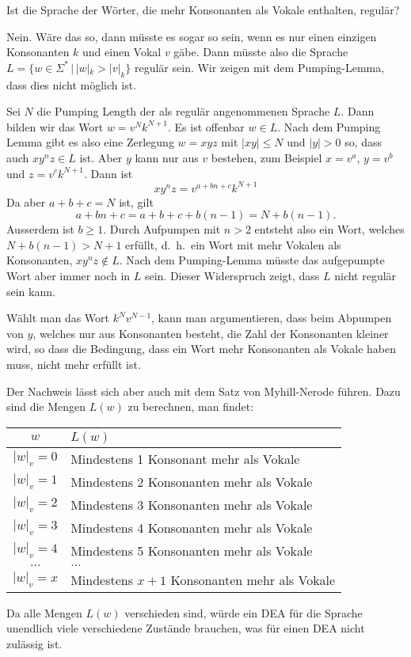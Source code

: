 Ist die Sprache der Wörter, die mehr Konsonanten als Vokale enthalten,
regulär?


\begin{loesung}
Nein. Wäre das so, dann müsste es sogar so sein, wenn es nur einen
einzigen Konsonanten $k$ und einen Vokal $v$ gäbe.
Dann müsste also die Sprache $L=\{ w\in\Sigma^*\,|\, |w|_k > |v|_k\}$
regulär sein. Wir zeigen mit dem Pumping-Lemma, dass dies nicht möglich
ist.

Sei $N$ die Pumping Length der als regulär angenommenen Sprache $L$.
Dann bilden wir das Wort $w=v^{N}k^{N+1}$. Es ist offenbar $w\in L$.
Nach dem Pumping Lemma gibt es also eine Zerlegung $w=xyz$ mit
$|xy|\le N$ und $|y|>0$ so, dass auch $xy^nz\in L$ ist.
Aber $y$ kann nur aus $v$ bestehen, zum Beispiel $x=v^a$, $y=v^b$ und
$z=v^ck^{N+1}$. Dann ist
\[
xy^nz=v^{a+bn+c}k^{N+1}
\]
Da aber $a+b+c=N$ ist, gilt
\[
a+bn+c=a+b+c + b(n-1)=N+b(n-1).
\]
Ausserdem ist $b\ge 1$.
Durch Aufpumpen mit $n> 2$ entsteht also ein Wort, welches
$N+b(n-1)> N+1$ erfüllt, d.~h.~ein Wort mit mehr Vokalen als
Konsonanten, $xy^nz\not\in L$. Nach dem Pumping-Lemma müsste das
aufgepumpte Wort aber immer noch in $L$ sein. Dieser Widerspruch
zeigt, dass $L$ nicht regulär sein kann.

Wählt man das Wort $k^Nv^{N-1}$, kann man argumentieren, dass
beim Abpumpen von $y$, welches nur aus Konsonanten besteht, die
Zahl der Konsonanten kleiner wird, so dass die Bedingung, dass ein
Wort mehr Konsonanten als Vokale haben muss, nicht mehr erfüllt ist.

Der Nachweis lässt sich aber auch mit dem Satz von Myhill-Nerode
führen. Dazu sind die Mengen $L(w)$ zu berechnen, man findet:
\begin{center}
\begin{tabular}{|c|l|}
\hline
$w$&$L(w)$\\
\hline
$|w|_v=0$&Mindestens 1 Konsonant mehr als Vokale\\
$|w|_v=1$&Mindestens 2 Konsonanten mehr als Vokale\\
$|w|_v=2$&Mindestens 3 Konsonanten mehr als Vokale\\
$|w|_v=3$&Mindestens 4 Konsonanten mehr als Vokale\\
$|w|_v=4$&Mindestens 5 Konsonanten mehr als Vokale\\
$\dots$&$\dots$\\
$|w|_v=x$&Mindestens $x+1$ Konsonanten mehr als Vokale\\
\hline
\end{tabular}
\end{center}
Da alle Mengen $L(w)$ verschieden sind, würde ein DEA für die Sprache
unendlich viele verschiedene Zustände brauchen, was für einen
DEA nicht zulässig ist.
\end{loesung}

